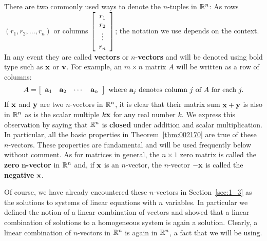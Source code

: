 There are two commonly used ways to denote the $n$-tuples in $\mathbb{R}^{n}$: As rows $(r_{1}, r_{2}, \dots, r_{n})$ or columns $\left[ \begin{array}{c}
r_{1} \\
r_{2} \\
\vdots \\
r_{n}
\end{array} \right]$;
 the notation we use depends on the context. In any event they are called \textbf{vectors} or $n$-\textbf{vectors} and will be denoted using bold type such as $\textbf{x}$ or $\textbf{v}$. For example, an $m \times n$ matrix $A$ will be written as a row of columns:
\begin{equation*}
A = \left[ \begin{array}{cccc}
\textbf{a}_{1} & \textbf{a}_{2} & \cdots & \textbf{a}_{n}
\end{array} \right] \mbox{ where } \textbf{a}_{j} \mbox{ denotes column } j \mbox{ of } A \mbox{ for each } j.
\end{equation*}
If $\textbf{x}$ and $\textbf{y}$ are two $n$-vectors in $\mathbb{R}^n$, it is clear that their matrix sum $\textbf{x} + \textbf{y}$ is also in $\mathbb{R}^n$ as is the scalar multiple $k\textbf{x}$ for any real number $k$. We express this observation by saying that $\mathbb{R}^n$ is \textbf{closed} under addition and scalar multiplication. In particular, all the basic properties in Theorem~\ref{thm:002170} are true of these $n$-vectors. These properties are fundamental and will be used frequently below without comment. As for matrices in general, the $n \times 1$ zero matrix is called the \textbf{zero} $\bm{n}$\textbf{-vector} in $\mathbb{R}^n$ and, if $\textbf{x}$ is an $n$-vector, the $n$-vector $-\textbf{x}$ is called the \textbf{negative} $\textbf{x}$.


Of course, we have already encountered these $n$-vectors in Section~\ref{sec:1_3} as the solutions to systems of linear equations with $n$ variables. In particular we defined the notion of a linear combination of vectors and showed that a linear combination of solutions to a homogeneous system is again a solution. Clearly, a linear combination of $n$-vectors in $\mathbb{R}^n$ is again in $\mathbb{R}^n$, a fact that we will be using.


